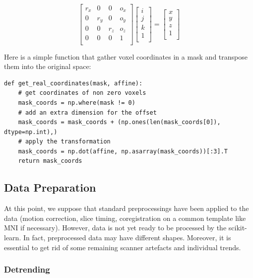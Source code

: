\documentclass{frontiersSCNS} %
\begin{document}
\[
    \begin{bmatrix}
        r_x & 0   & 0   & o_x \\
        0   & r_y & 0   & o_y \\
        0   & 0   & r_z & o_z \\
        0   & 0   & 0   & 1   \\
    \end{bmatrix}
    \begin{bmatrix}
        i \\
        j \\
        k \\
        1 \\
    \end{bmatrix}
    =
    \begin{bmatrix}
        x \\
        y \\
        z \\
        1 \\
    \end{bmatrix}
\]

Here is a simple function that gather voxel coordinates in a mask and transpose
them into the original space:


\begin{lstlisting}
def get_real_coordinates(mask, affine):
    # get coordinates of non zero voxels
    mask_coords = np.where(mask != 0)
    # add an extra dimension for the offset
    mask_coords = mask_coords + (np.ones(len(mask_coords[0]), dtype=np.int),)
    # apply the transformation
    mask_coords = np.dot(affine, np.asarray(mask_coords))[:3].T
    return mask_coords
\end{lstlisting}


\subsection{Data Preparation}

At this point, we suppose that standard preprocessings have been applied to the
data (motion correction, slice timing, coregistration on a common template like
MNI if necessary).
However, data is not yet ready to be processed by the scikit-learn. In
fact, preprocessed data may have different shapes. Moreover, it is essential to
get rid of some remaining scanner artefacts and individual trends.

\subsubsection{Detrending}
\end{document}
